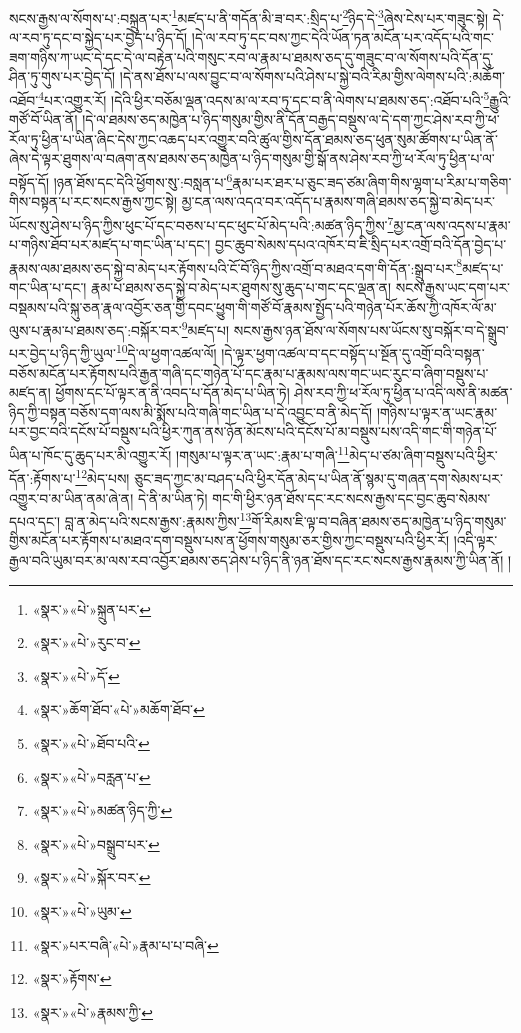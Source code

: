 སངས་རྒྱས་ལ་སོགས་པ་:བསྐྲུན་པར་\footnote{«སྣར་»«པེ་»སྐྲུན་པར་}མཛད་པ་ནི་གདོན་མི་ཟ་བར་:སྲིད་པ་\footnote{«སྣར་»«པེ་»རུང་བ་}ཉིད་དེ་\footnote{«སྣར་»«པེ་»དོ་}ཞེས་ངེས་པར་གཟུང་སྟེ། དེ་ལ་རབ་ཏུ་དང་བ་སྐྱེད་པར་བྱེད་པ་ཉིད་དོ། །དེ་ལ་རབ་ཏུ་དང་བས་ཀྱང་དེའི་ཡོན་ཏན་མངོན་པར་འདོད་པའི་གང་ཟག་གཉིས་ཀ་ཡང་དེ་དང་དེ་ལ་བརྟེན་པའི་གསུང་རབ་ལ་རྣམ་པ་ཐམས་ཅད་དུ་གཟུང་བ་ལ་སོགས་པའི་དོན་དུ་ཤིན་ཏུ་གུས་པར་བྱེད་དོ། །དེ་ནས་ཐོས་པ་ལས་བྱུང་བ་ལ་སོགས་པའི་ཤེས་པ་སྐྱེ་བའི་རིམ་གྱིས་ལེགས་པའི་:མཆོག་འཐོབ་\footnote{«སྣར་»ཆོག་ཐོབ་«པེ་»མཆོག་ཐོབ་}པར་འགྱུར་རོ། །དེའི་ཕྱིར་བཅོམ་ལྡན་འདས་མ་ལ་རབ་ཏུ་དང་བ་ནི་ལེགས་པ་ཐམས་ཅད་:འཐོབ་པའི་\footnote{«སྣར་»«པེ་»ཐོབ་པའི་}རྒྱུའི་གཙོ་བོ་ཡིན་ནོ། །དེ་ལ་ཐམས་ཅད་མཁྱེན་པ་ཉིད་གསུམ་གྱིས་ནི་དོན་བརྒྱད་བསྡུས་ལ་དེ་དག་ཀྱང་ཤེས་རབ་ཀྱི་ཕ་རོལ་ཏུ་ཕྱིན་པ་ཡིན་ཞིང་དེས་ཀྱང་འཆད་པར་འགྱུར་བའི་ཚུལ་གྱིས་དོན་ཐམས་ཅད་ཕུན་སུམ་ཚོགས་པ་ཡིན་ནོ་ཞེས་དེ་ལྟར་ཐུགས་ལ་བཞག་ནས་ཐམས་ཅད་མཁྱེན་པ་ཉིད་གསུམ་གྱི་སྒོ་ནས་ཤེས་རབ་ཀྱི་ཕ་རོལ་ཏུ་ཕྱིན་པ་ལ་བསྟོད་དོ། །ཉན་ཐོས་དང་དེའི་ཕྱོགས་སུ་:བསླན་པ་\footnote{«སྣར་»«པེ་»བརླན་པ་}རྣམ་པར་ཐར་པ་ཅུང་ཟད་ཙམ་ཞིག་གིས་ལྷག་པ་རིམ་པ་གཅིག་གིས་བསྟན་པ་རང་སངས་རྒྱས་ཀྱང་སྟེ། མྱ་ངན་ལས་འདའ་བར་འདོད་པ་རྣམས་གཞི་ཐམས་ཅད་སྐྱེ་བ་མེད་པར་ཡོངས་སུ་ཤེས་པ་ཉིད་ཀྱིས་ཕུང་པོ་དང་བཅས་པ་དང་ཕུང་པོ་མེད་པའི་:མཚན་ཉིད་ཀྱིས་\footnote{«སྣར་»«པེ་»མཚན་ཉིད་ཀྱི་}མྱ་ངན་ལས་འདས་པ་རྣམ་པ་གཉིས་ཐོབ་པར་མཛད་པ་གང་ཡིན་པ་དང་། བྱང་ཆུབ་སེམས་དཔའ་འཁོར་བ་ཇི་སྲིད་པར་འགྲོ་བའི་དོན་བྱེད་པ་རྣམས་ལམ་ཐམས་ཅད་སྐྱེ་བ་མེད་པར་རྟོགས་པའི་ངོ་བོ་ཉིད་ཀྱིས་འགྲོ་བ་མཐའ་དག་གི་དོན་:སྒྲུབ་པར་\footnote{«སྣར་»«པེ་»བསྒྲུབ་པར་}མཛད་པ་གང་ཡིན་པ་དང་། རྣམ་པ་ཐམས་ཅད་སྐྱེ་བ་མེད་པར་ཐུགས་སུ་ཆུད་པ་གང་དང་ལྡན་ན། སངས་རྒྱས་ཡང་དག་པར་བསྡམས་པའི་སྐུ་ཅན་རྣལ་འབྱོར་ཅན་གྱི་དབང་ཕྱུག་གི་གཙོ་བོ་རྣམས་སྤྱོད་པའི་གཉེན་པོར་ཆོས་ཀྱི་འཁོར་ལོ་མ་ལུས་པ་རྣམ་པ་ཐམས་ཅད་:བསྐོར་བར་\footnote{«སྣར་»«པེ་»སྐོར་བར་}མཛད་པ། སངས་རྒྱས་ཉན་ཐོས་ལ་སོགས་པས་ཡོངས་སུ་བསྐོར་བ་དེ་སྒྲུབ་པར་བྱེད་པ་ཉིད་ཀྱི་ཡུལ་\footnote{«སྣར་»«པེ་»ཡུམ་}དེ་ལ་ཕྱག་འཚལ་ལོ། །དེ་ལྟར་ཕྱག་འཚལ་བ་དང་བསྟོད་པ་སྔོན་དུ་འགྲོ་བའི་བསྟན་བཅོས་མངོན་པར་རྟོགས་པའི་རྒྱན་གཞི་དང་གཉེན་པོ་དང་རྣམ་པ་རྣམས་ལས་གང་ཡང་རུང་བ་ཞིག་བསྡུས་པ་མཛད་ན། ཕྱོགས་དང་པོ་ལྟར་ན་ནི་འབད་པ་དོན་མེད་པ་ཡིན་ཏེ། ཤེས་རབ་ཀྱི་ཕ་རོལ་ཏུ་ཕྱིན་པ་འདི་ལས་ནི་མཚན་ཉིད་ཀྱི་བསྟན་བཅོས་དག་ལས་མི་སྨོས་པའི་གཞི་གང་ཡིན་པ་དེ་འབྱུང་བ་ནི་མེད་དོ། །གཉིས་པ་ལྟར་ན་ཡང་རྣམ་པར་བྱང་བའི་དངོས་པོ་བསྡུས་པའི་ཕྱིར་ཀུན་ནས་ཉོན་མོངས་པའི་དངོས་པོ་མ་བསྡུས་པས་འདི་གང་གི་གཉེན་པོ་ཡིན་པ་ཁོང་དུ་ཆུད་པར་མི་འགྱུར་རོ། །གསུམ་པ་ལྟར་ན་ཡང་:རྣམ་པ་གཞི་\footnote{«སྣར་»པར་བཞི་«པེ་»རྣམ་པ་པ་བཞི་}མེད་པ་ཙམ་ཞིག་བསྡུས་པའི་ཕྱིར་དོན་:རྟོགས་པ་\footnote{«སྣར་»རྟོགས་}མེད་པས། ཅུང་ཟད་ཀྱང་མ་བཤད་པའི་ཕྱིར་དོན་མེད་པ་ཡིན་ནོ་སྙམ་དུ་གཞན་དག་སེམས་པར་འགྱུར་བ་མ་ཡིན་ནམ་ཞེ་ན། དེ་ནི་མ་ཡིན་ཏེ། གང་གི་ཕྱིར་ཉན་ཐོས་དང་རང་སངས་རྒྱས་དང་བྱང་ཆུབ་སེམས་དཔའ་དང་། བླ་ན་མེད་པའི་སངས་རྒྱས་:རྣམས་ཀྱིས་\footnote{«སྣར་»«པེ་»རྣམས་ཀྱི་}གོ་རིམས་ཇི་ལྟ་བ་བཞིན་ཐམས་ཅད་མཁྱེན་པ་ཉིད་གསུམ་གྱིས་མངོན་པར་རྟོགས་པ་མཐའ་དག་བསྡུས་པས་ན་ཕྱོགས་གསུམ་ཅར་གྱིས་ཀྱང་བསྡུས་པའི་ཕྱིར་རོ། །འདི་ལྟར་རྒྱལ་བའི་ཡུམ་བར་མ་ལས་རབ་འབྱོར་ཐམས་ཅད་ཤེས་པ་ཉིད་ནི་ཉན་ཐོས་དང་རང་སངས་རྒྱས་རྣམས་ཀྱི་ཡིན་ནོ། །
